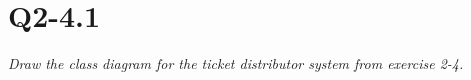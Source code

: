 \section{Q2-4.1}
\emph{Draw the class diagram for the ticket distributor system from exercise 2-4.}
